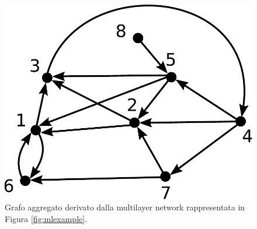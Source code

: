 \begin{figure}
    \centering
    \includegraphics[height=0.15865384615384615\textheight]{img/aggexample1.pdf}
    \caption{Grafo aggregato derivato dalla multilayer network rappresentata in Figura \ref{fig:mlexample}.}
    \label{fig:graggexample}
\end{figure}

